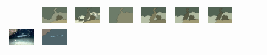 \begin{figure}[tb]
\begin{center}
\begin{tabular}{cccccccccc}
&\includegraphics[width=2cm]{scale-aware/fig/visual_result/visual_result_3_2.png} \hspace{-4mm}
&\includegraphics[width=2cm]{scale-aware/fig/visual_result/visual_result_3_3.png} \hspace{-4mm}
&\includegraphics[width=2cm]{scale-aware/fig/visual_result/visual_result_3_4.png}\hspace{-4mm}
&\includegraphics[width=2cm]{scale-aware/fig/visual_result/visual_result_3_5.png}\hspace{-4mm}
&\includegraphics[width=2cm]{scale-aware/fig/visual_result/visual_result_3_6.png}\hspace{-4mm}
&\includegraphics[width=2cm]{scale-aware/fig/visual_result/visual_result_3_7.png}\hspace{-4mm}
\\
\hspace{-2mm}
\includegraphics[width=2cm]{scale-aware/fig/visual_result/visual_result_4_1.png} \hspace{-4mm}
&\includegraphics[width=2cm]{scale-aware/fig/visual_result/visual_result_4_2.png}\hspace{-4mm}

\end{tabular}
\end{center}
\end{figure}
